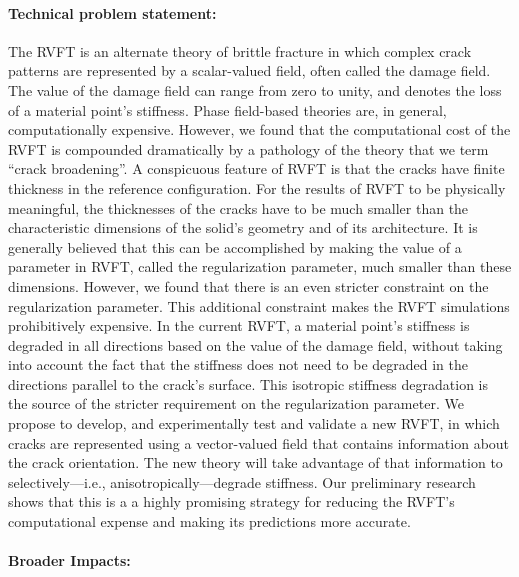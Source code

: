 \documentclass[10pt,letterpaper]{article}
\begin{document}
\paragraph{Technical problem statement:}
The RVFT is an alternate theory of brittle fracture  in which complex crack patterns are represented by a scalar-valued field, often called the damage field.  The value of the damage field can range from zero to unity, and denotes the loss of a material point's stiffness. Phase field-based theories are, in general, computationally expensive. However, we found that the computational cost of the RVFT is compounded dramatically by a pathology of the theory that we term ``crack broadening''. A conspicuous feature of RVFT is that the cracks have finite thickness in the reference configuration. For the results of RVFT to be physically meaningful, the thicknesses of the cracks have to be much smaller than the characteristic dimensions of the solid's geometry and of its architecture.  It is generally believed that this can be accomplished by making the value of a parameter in RVFT, called the regularization parameter, much smaller than these dimensions.  However, we found that there is an even stricter constraint on the regularization parameter. This additional constraint makes the RVFT simulations prohibitively expensive. In the current RVFT, a material point's stiffness is degraded in all directions based on the value of the damage field, without  taking into account  the fact that the stiffness does not need to be degraded in the directions parallel to the crack's surface.  This isotropic stiffness degradation is the source of the stricter requirement on the regularization parameter. We  propose to develop, and experimentally test and validate a new RVFT, in which cracks are represented using a vector-valued field that contains information about the crack orientation. The new theory will take advantage of that information to selectively---i.e., anisotropically---degrade stiffness.  Our preliminary research shows that this is a a highly promising strategy for reducing the RVFT's computational expense and making its predictions more accurate.


\paragraph{Broader Impacts:}
\end{document}
